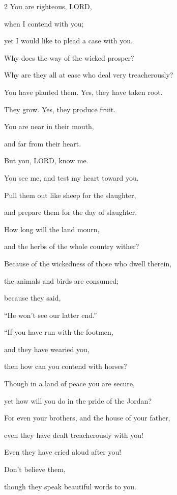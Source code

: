 \mychapter{}\begin{multicols}{2}
	\myverse*{}You are righteous, LORD,
	
	\quad\quad when I contend with you;
	
	yet I would like to plead a case with you.
	
	Why does the way of the wicked prosper?
	
	Why are they all at ease who deal very treacherously?
	
	
	\myverse{}You have planted them. Yes, they have taken root.
	
	They grow. Yes, they produce fruit.
	
	You are near in their mouth,
	
	and far from their heart.
	
	
	\myverse{}But you, LORD, know me.
	
	You see me, and test my heart toward you.
	
	Pull them out like sheep for the slaughter,
	
	and prepare them for the day of slaughter.
	
	
	\myverse{}How long will the land mourn,
	
	and the herbs of the whole country wither?
	
	Because of the wickedness of those who dwell therein,
	
	the animals and birds are consumed;
	
	because they said,
	
	“He won’t see our latter end.”
	
	
	\myverse{}“If you have run with the footmen,
	
	and they have wearied you,
	
	then how can you contend with horses?
	
	Though in a land of peace you are secure,
	
	yet how will you do in the pride of the Jordan?
	
	
	\myverse{}For even your brothers, and the house of your father,
	
	even they have dealt treacherously with you!
	
	Even they have cried aloud after you!
	
	Don’t believe them,
	
	though they speak beautiful words to you.
	
	
	\vspace{\baselineskip}
	

\end{multicols}
